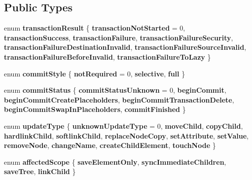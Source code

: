 \subsection*{\-Public \-Types}
\begin{DoxyCompactItemize}
\item 
enum {\bfseries transaction\-Result} \{ \*
{\bfseries transaction\-Not\-Started} =  0, 
{\bfseries transaction\-Success}, 
{\bfseries transaction\-Failure}, 
{\bfseries transaction\-Failure\-Security}, 
\*
{\bfseries transaction\-Failure\-Destination\-Invalid}, 
{\bfseries transaction\-Failure\-Source\-Invalid}, 
{\bfseries transaction\-Failure\-Before\-Invalid}, 
{\bfseries transaction\-Failure\-To\-Lazy}
 \}
\item 
enum {\bfseries commit\-Style} \{ {\bfseries not\-Required} =  0, 
{\bfseries selective}, 
{\bfseries full}
 \}
\item 
enum {\bfseries commit\-Status} \{ \*
{\bfseries commit\-Status\-Unknown} =  0, 
{\bfseries begin\-Commit}, 
{\bfseries begin\-Commit\-Create\-Placeholders}, 
{\bfseries begin\-Commit\-Transaction\-Delete}, 
\*
{\bfseries begin\-Commit\-Swap\-In\-Placeholders}, 
{\bfseries commit\-Finished}
 \}
\item 
enum {\bfseries update\-Type} \{ \*
{\bfseries unknown\-Update\-Type} =  0, 
{\bfseries move\-Child}, 
{\bfseries copy\-Child}, 
{\bfseries hardlink\-Child}, 
\*
{\bfseries softlink\-Child}, 
{\bfseries replace\-Node\-Copy}, 
{\bfseries set\-Attribute}, 
{\bfseries set\-Value}, 
\*
{\bfseries remove\-Node}, 
{\bfseries change\-Name}, 
{\bfseries create\-Child\-Element}, 
{\bfseries touch\-Node}
 \}
\item 
enum {\bfseries affected\-Scope} \{ {\bfseries save\-Element\-Only}, 
{\bfseries sync\-Immediate\-Children}, 
{\bfseries save\-Tree}, 
{\bfseries link\-Child}
 \}
\end{DoxyCompactItemize}
